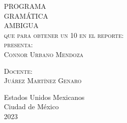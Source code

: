 \begin{titlepage}
\begin{minipage}[c][0.81\textheight][t]{0.75\textwidth}
\begin{center}
      \textsc{\LARGE P\hspace{0.5cm}R\hspace{0.5cm}O\hspace{0.5cm}G\hspace{0.5cm}R\hspace{0.5cm}A\hspace{0.5cm}M\hspace{0.5cm}A\hspace{0.5cm}}\\[1cm]
      \textsc{\LARGE G\hspace{0.5cm}R\hspace{0.5cm}A\hspace{0.5cm}M\hspace{0.5cm}Á\hspace{0.5cm}T\hspace{0.5cm}I\hspace{0.5cm}C\hspace{0.5cm}A}\\[1cm]
      \textsc{\LARGE\hspace{0.5cm}A\hspace{0.5cm}M\hspace{0.5cm}B\hspace{0.5cm}I\hspace{0.5cm}G\hspace{0.5cm}U\hspace{0.5cm}A}
      \\[1cm]
      \textsc{\large que para obtener un 10 en el reporte:}\\[0.2cm]
      
      {\color{red}\textsc{\large presenta:}}\\[0.2cm]
      \textsc{\large {Connor Urbano Mendoza}}\\[1cm]          

      \vspace{0.5cm}

      {\large\scshape 
        {\color{red}Docente:}\\[0.3cm] {Juárez Martínez Genaro}}\\[.2in]

      \vspace{1cm}

      \large{Estados Unidos Mexicanos\\ 
        Ciudad de México\\
        2023}
    \end{center}
  \end{minipage}
\end{titlepage}
